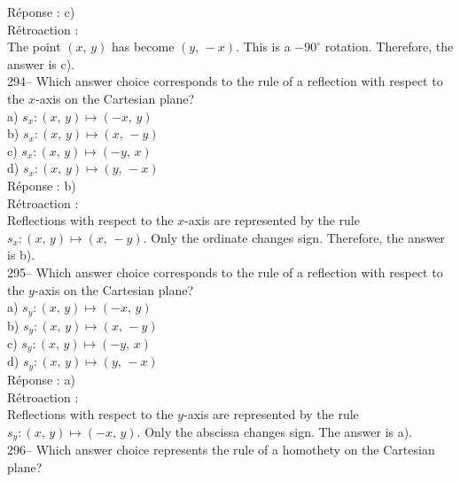 \documentclass[letterpaper, 12pt]{article}
\begin{document}
R\'eponse : c)\\

R\'etroaction : \\
The point $(x,\,y)$ has become $(y,\,-x)$. This is a
$-90^{\circ}$ rotation. Therefore, the answer is c).  \\

294-- Which answer choice corresponds to the rule of a reflection
with respect to the $x$-axis on the Cartesian plane?\\

a) $s_x :\left( x,\,y\right) \longmapsto \left(-x,\,y\right) $ \\
b) $s_x :\left( x,\,y\right) \longmapsto \left(x,\,-y\right) $ \\
c) $s_x :\left( x,\,y\right) \longmapsto \left(-y,\,x\right) $ \\
d) $s_x :\left( x,\,y\right) \longmapsto \left(y,\,-x\right) $ \\

R\'eponse : b)\\

R\'etroaction : \\
Reflections with respect to the $x$-axis are represented by the rule
$s_x :\left( x,\,y\right) \longmapsto \left(x,\,-y\right)$. Only the
ordinate changes sign. Therefore, the answer is b).\\

295-- Which answer choice corresponds to the rule of a reflection
with respect to the $y$-axis on the Cartesian plane?\\

a) $s_y :\left( x,\,y\right) \longmapsto \left(-x,\,y\right) $ \\
b) $s_y :\left( x,\,y\right) \longmapsto \left(x,\,-y\right) $ \\
c) $s_y :\left( x,\,y\right) \longmapsto \left(-y,\,x\right) $ \\
d) $s_y :\left( x,\,y\right) \longmapsto \left(y,\,-x\right) $ \\


R\'eponse : a)\\

R\'etroaction : \\
Reflections with respect to the $y$-axis are represented by the rule
$s_y :\left( x,\,y\right) \longmapsto \left(-x,\,y\right)$. Only the
abscissa changes sign. The answer is a).\\

296-- Which answer choice represents the rule of a homothety on the
Cartesian plane?\\
\end{document}

